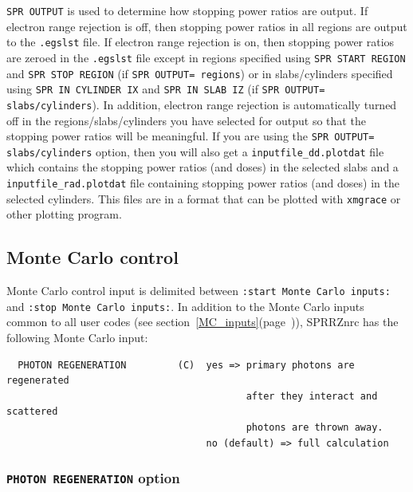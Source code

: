 \documentclass[12pt,twoside]{article}  %
\newcommand{\lpage}[1]{(page~\pageref{#1})}
\begin{document}
{\tt SPR OUTPUT} is used to determine how stopping power ratios are
output.  If electron range rejection is off, then stopping power ratios
in all regions are output to the {\tt .egslst} file.  If electron
range rejection is on, then stopping power ratios are zeroed in the
{\tt .egslst} file except in regions specified using
{\tt SPR START REGION} and {\tt SPR STOP REGION} (if
{\tt SPR OUTPUT= regions}) or in slabs/cylinders specified using
{\tt SPR IN CYLINDER IX} and {\tt SPR IN SLAB IZ} (if
{\tt SPR OUTPUT= slabs/cylinders}).  In addition, electron range rejection
is automatically turned off in the regions/slabs/cylinders you have selected
for output so that the stopping power ratios will be meaningful.  If you
are using the {\tt SPR OUTPUT= slabs/cylinders} option, then you will also
get a {\tt inputfile\_dd.plotdat} file which contains the stopping power ratios (and
doses) in the selected slabs and a {\tt inputfile\_rad.plotdat} file
containing stopping power ratios (and doses) in the selected cylinders.
This files are in a format that can be plotted
with {\tt xmgrace} or other plotting program.

\subsection{Monte Carlo control}

Monte Carlo control input is delimited between
\verb+:start Monte Carlo inputs:+\\
and \verb+:stop Monte Carlo inputs:+. In addition to the Monte Carlo inputs
common to all user codes (see section~\ref{MC_inputs}\lpage{MC_inputs}),
SPRRZnrc has the following Monte Carlo input:
\begin{verbatim}
  PHOTON REGENERATION         (C)  yes => primary photons are regenerated
                                          after they interact and scattered
                                          photons are thrown away.
                                   no (default) => full calculation

\end{verbatim}

\subsubsection{{\tt PHOTON REGENERATION} option}
\label{photregsect}
\end{document}
